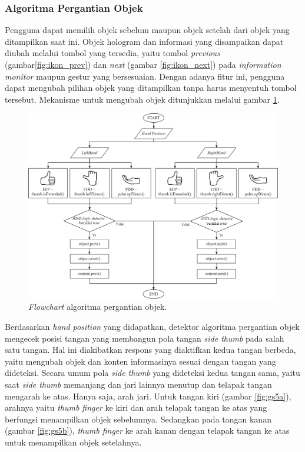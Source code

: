 		\subsubsection{Algoritma Pergantian Objek}
		\vspace{0.5ex}
			 Pengguna dapat memilih objek sebelum maupun objek setelah dari objek yang ditampilkan saat ini. Objek hologram dan informasi yang disampaikan dapat diubah melalui tombol yang tersedia, yaitu tombol \textit{previous} (gambar\ref{fig:ikon_prev}) dan \textit{next} (gambar \ref{fig:ikon_next})  pada \textit{information monitor} maupun gestur yang bersesuaian. Dengan adanya fitur ini, pengguna dapat mengubah pilihan objek yang ditampilkan tanpa harus menyentuh tombol tersebut. Mekanisme untuk mengubah objek ditunjukkan melalui gambar \ref{fig:flow_ganti}.
			 \begin{figure} [H]
			 	\includegraphics[width=\textwidth]{img/bab3/flow_ganti.png}
			 	\caption{\textit{Flowchart} algoritma pergantian objek.}
			 	\label{fig:flow_ganti}
			 \end{figure}
		 	\vspace{-2ex}
		 
		 	Berdasarkan \textit{hand position} yang didapatkan, detektor algoritma pergantian objek mengecek posisi tangan yang membangun pola tangan \textit{side thumb} pada salah satu tangan. Hal ini diakibatkan respons yang diaktifkan kedua tangan berbeda, yaitu mengubah objek dan konten informasinya sesuai dengan tangan yang dideteksi. Secara umum pola \textit{side thumb} yang dideteksi kedua tangan sama, yaitu saat \textit{side thumb} memanjang dan jari lainnya menutup dan telapak tangan mengarah ke atas. Hanya saja, arah jari. Untuk tangan kiri (gambar \ref{fig:gs5a}), arahnya yaitu \textit{thumb finger} ke kiri dan arah telapak tangan ke atas yang berfungsi menampilkan objek sebelumnya. Sedangkan pada tangan kanan (gambar \ref{fig:gs5b}), \textit{thumb finger} ke arah kanan dengan telapak tangan ke atas untuk menampilkan objek setelahnya.
		 \vspace{0.75ex}
		 	
